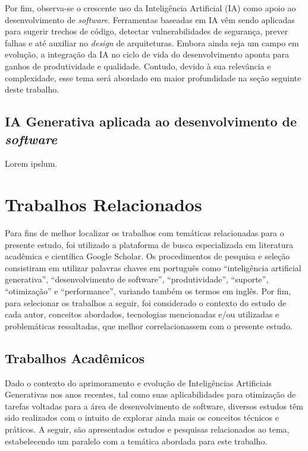 \documentclass[english,brazilian]{UNISINOSartigo} %
\begin{document}
Por fim, observa-se o crescente uso da Inteligência Artificial (IA) como apoio ao desenvolvimento de \textit{software}. Ferramentas baseadas em IA vêm sendo aplicadas para sugerir trechos de código, detectar vulnerabilidades de segurança, prever falhas e até auxiliar no \textit{design} de arquiteturas. Embora ainda seja um campo em evolução, a integração da IA no ciclo de vida do desenvolvimento aponta para ganhos de produtividade e qualidade. Contudo, devido à sua relevância e complexidade, esse tema será abordado em maior profundidade na seção seguinte deste trabalho.

\subsection{IA Generativa aplicada ao desenvolvimento de \textit{software}}

Lorem ipslum.

\section{Trabalhos Relacionados}

Para fins de melhor localizar os trabalhos com temáticas relacionadas para o presente estudo, foi utilizado a plataforma de busca especializada em literatura acadêmica e científica Google Scholar. Os procedimentos de pesquisa e seleção consistiram em utilizar palavras chaves em português como “inteligência artificial generativa”, “desenvolvimento de software”, “produtividade”, “suporte”, “otimização” e “performance”, variando também os termos em inglês. Por fim, para selecionar os trabalhos a seguir, foi considerado o contexto do estudo de cada autor, conceitos abordados, tecnologias mencionadas e/ou utilizadas e problemáticas ressaltadas, que melhor correlacionassem com o presente estudo.

\subsection{Trabalhos Acadêmicos}

Dado o contexto do aprimoramento e evolução de Inteligências Artificiais Generativas nos anos recentes, tal como suas aplicabilidades para otimização de tarefas voltadas para a área de desenvolvimento de software, diversos estudos têm sido realizados com o intuito de explorar ainda mais os conceitos técnicos e práticos. A seguir, são apresentados estudos e pesquisas relacionados ao tema, estabelecendo um paralelo com a temática abordada para este trabalho.
\end{document}
